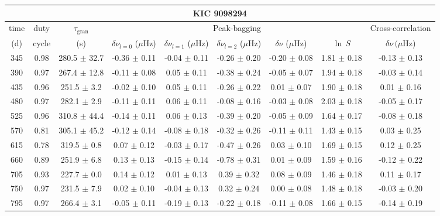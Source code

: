 \documentclass[twocolumn]{aastex61}%
\begin{document}
\FloatBarrier
\nopagebreak

\begin{table}[ht]\centering\fontsize{9.}{7.}\selectfont
\begin{tabular}{ccc|ccccc|c}
\multicolumn{9}{c}{KIC 9098294}\\ \hline\hline
time & duty & $\tau_\text{gran}$ &\multicolumn{5}{c|}{Peak-bagging}&Cross-correlation\\
(d)& cycle & (s)&$\delta\nu_{l=0}$ ($\mu$Hz) & $\delta\nu_{l=1}$ ($\mu$Hz) & $\delta\nu_{l=2}$ ($\mu$Hz) & $\delta\nu$ ($\mu$Hz)& $\ln\,S$ & $\delta\nu\,(\mu$Hz)\\\hline
345 & 0.98 & 280.5 $\pm$ 32.7 & -0.36 $\pm$ 0.11 & -0.04 $\pm$ 0.11 & -0.26 $\pm$ 0.20 & -0.20 $\pm$ 0.08 & 1.81 $\pm$ 0.18 & -0.13 $\pm$ 0.13\\
390 & 0.97 & 267.4 $\pm$ 12.8 & -0.11 $\pm$ 0.08 & 0.05 $\pm$ 0.11 & -0.38 $\pm$ 0.24 & -0.05 $\pm$ 0.07 & 1.94 $\pm$ 0.18 & -0.03 $\pm$ 0.14\\
435 & 0.96 & 251.5 $\pm$ 3.2 & -0.02 $\pm$ 0.10 & 0.05 $\pm$ 0.11 & -0.26 $\pm$ 0.22 & 0.01 $\pm$ 0.07 & 1.90 $\pm$ 0.18 & 0.01 $\pm$ 0.16\\
480 & 0.97 & 282.1 $\pm$ 2.9 & -0.11 $\pm$ 0.11 & 0.06 $\pm$ 0.11 & -0.08 $\pm$ 0.16 & -0.03 $\pm$ 0.08 & 2.03 $\pm$ 0.18 & -0.05 $\pm$ 0.17\\
525 & 0.96 & 310.8 $\pm$ 44.4 & -0.14 $\pm$ 0.11 & 0.06 $\pm$ 0.13 & -0.39 $\pm$ 0.20 & -0.05 $\pm$ 0.09 & 1.64 $\pm$ 0.17 & -0.08 $\pm$ 0.18\\
570 & 0.81 & 305.1 $\pm$ 45.2 & -0.12 $\pm$ 0.14 & -0.08 $\pm$ 0.18 & -0.32 $\pm$ 0.26 & -0.11 $\pm$ 0.11 & 1.43 $\pm$ 0.15 & 0.03 $\pm$ 0.25\\
615 & 0.78 & 319.5 $\pm$ 0.8 & 0.07 $\pm$ 0.12 & -0.03 $\pm$ 0.17 & -0.47 $\pm$ 0.26 & 0.03 $\pm$ 0.10 & 1.69 $\pm$ 0.15 & 0.12 $\pm$ 0.25\\
660 & 0.89 & 251.9 $\pm$ 6.8 & 0.13 $\pm$ 0.13 & -0.15 $\pm$ 0.14 & -0.78 $\pm$ 0.31 & 0.01 $\pm$ 0.09 & 1.59 $\pm$ 0.16 & -0.12 $\pm$ 0.22\\
705 & 0.93 & 227.7 $\pm$ 0.0 & 0.14 $\pm$ 0.12 & 0.01 $\pm$ 0.13 & 0.39 $\pm$ 0.32 & 0.08 $\pm$ 0.09 & 1.46 $\pm$ 0.18 & 0.11 $\pm$ 0.17\\
750 & 0.97 & 231.5 $\pm$ 7.9 & 0.02 $\pm$ 0.10 & -0.04 $\pm$ 0.13 & 0.32 $\pm$ 0.24 & 0.00 $\pm$ 0.08 & 1.48 $\pm$ 0.18 & -0.03 $\pm$ 0.20\\
795 & 0.97 & 266.4 $\pm$ 3.1 & -0.05 $\pm$ 0.11 & -0.19 $\pm$ 0.13 & -0.22 $\pm$ 0.18 & -0.11 $\pm$ 0.08 & 1.66 $\pm$ 0.15 & -0.14 $\pm$ 0.19\\

\end{tabular}
\end{table}
\end{document}
